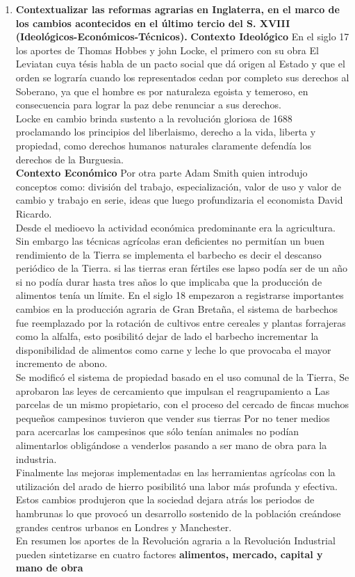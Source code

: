 \documentclass[12pt]{book}
\begin{document}
\begin{enumerate}

\item \textbf{Contextualizar las reformas agrarias en Inglaterra, en el marco de los cambios
acontecidos en el último tercio del S. XVIII (Ideológicos-Económicos-Técnicos).}
\textbf{Contexto Ideológico}
En el siglo 17 los aportes de Thomas Hobbes y john Locke, el primero con su obra El Leviatan cuya tésis habla de un pacto social que dá origen al Estado y que el orden se lograría cuando los representados cedan por completo sus derechos al Soberano, ya que el hombre es por naturaleza egoista y temeroso, en consecuencia para lograr la paz debe renunciar a sus derechos.
\\
Locke en cambio brinda sustento a la revolución gloriosa de 1688 proclamando los principios del liberlaismo, derecho a la vida, liberta y propiedad, como derechos humanos naturales claramente defendía los derechos de la Burguesia.
\\
\textbf{Contexto Económico}
Por otra parte Adam Smith quien introdujo conceptos como: división del trabajo, especialización, valor de uso y valor de cambio y trabajo en serie, ideas que luego profundizaria el economista David Ricardo.
\\
Desde el medioevo la actividad económica predominante era la agricultura.  Sin embargo las técnicas agrícolas eran deficientes no permitían un buen rendimiento de la Tierra se implementa el barbecho es decir el descanso periódico de la Tierra.
 si las tierras eran fértiles ese lapso podía ser de un año si no podía durar hasta tres años lo que implicaba que la producción de alimentos tenía un límite.
En el siglo 18 empezaron a registrarse  importantes cambios en la producción agraria de Gran Bretaña,  el sistema de barbechos fue reemplazado por la rotación de cultivos entre cereales y plantas forrajeras como la alfalfa,  esto posibilitó dejar de lado el barbecho incrementar la disponibilidad de alimentos como carne y leche lo que provocaba el mayor incremento de abono.
\\
Se modificó el sistema de propiedad basado en el uso comunal de la Tierra, Se aprobaron las leyes de cercamiento que impulsan el reagrupamiento a Las parcelas de un mismo propietario,  con el proceso del cercado de fincas muchos pequeños campesinos tuvieron que vender sus tierras Por no tener medios para acercarlas los campesinos que sólo tenían animales no podían alimentarlos obligándose a venderlos pasando a ser mano de obra para la industria.
\\
Finalmente las mejoras implementadas en las herramientas agrícolas con la utilización del arado de hierro posibilitó una labor más profunda y efectiva.
\\
Estos cambios produjeron que la sociedad dejara atrás los periodos de hambrunas lo que provocó un desarrollo sostenido de la población creándose grandes centros urbanos en Londres y Manchester.
\\
En resumen los aportes de la Revolución agraria a la Revolución Industrial pueden sintetizarse en cuatro factores \textbf{alimentos, mercado, capital y mano de obra }



\end{enumerate}
\end{document}
